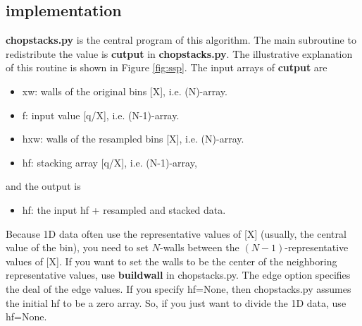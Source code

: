 \documentclass[iop, twocolumn, tighten]{emulateapj}
\begin{document}
\subsection{implementation}

{\bf chopstacks.py} is the central program of this algorithm. The main subroutine to redistribute the value is {\bf cutput} in {\bf chopstacks.py}. The illustrative explanation of this routine is shown in Figure \ref{fig:ssp}. 
The input arrays of {\bf cutput} are 
\begin{itemize}
\item xw: walls of the original bins [X], i.e. (N)-array.   
\item f: input value [q/X], i.e. (N-1)-array.   
\item hxw: walls of the resampled bins [X], i.e. (N)-array.   
\item hf: stacking array [q/X], i.e. (N-1)-array, 
\end{itemize}
and the output is 
\begin{itemize}
\item hf: the input hf + resampled and stacked data.
\end{itemize}
Because 1D data often use the representative values of [X] (usually, the central value of the bin), you need to set $N$-walls between the $(N-1)$-representative values of [X].   
If you want to set the walls to be the center of the neighboring representative values, use {\bf buildwall} in chopstacks.py. The edge option specifies the deal of the edge values. If you specify hf=None, then chopstacks.py assumes the initial hf to be a zero array. So, if you just want to divide the 1D data, use hf=None.  
\end{document}
